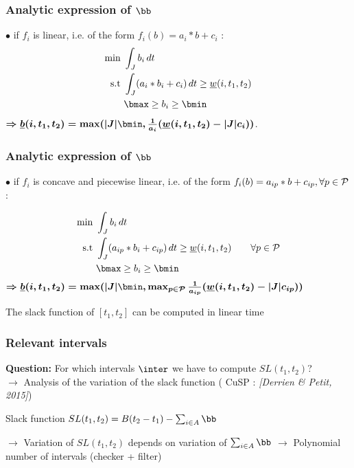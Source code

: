 \begin{frame}
  \frametitle{Analytic expression of $\bb$}
  \vfill
  $\bullet$ if $f_i$ is linear, i.e. of the form $f_i(b)= a_i*b+c_i$ :
  \pause
  \begin{align*}
    \text{min }  & \int_{J} b_i\,dt  \\
    \text{s.t } & \int_{J}(a_i*b_i+c_i)\,dt \ge
                  \underline{w}(i,t_1,t_2)\\
                 & \bmax \ge b_i \ge \bmin
  \end{align*}
  \pause
  { \color{blue!80!black!80}
    $\boldmath{\Rightarrow  \underline{b}(i,t_1,t_2)= \max ( |J|\bmin, \frac{1}{a_i}( \underline{w}(i,t_1,t_2)-|J|c_i))}$}.
  
\end{frame}

\begin{frame}
  \frametitle{Analytic expression of $\bb$}
  \vfill
  $\bullet$  if $f_i$ is concave and piecewise linear, i.e. of the form
  $f_i(b)=a_{ip}*b+c_{ip}, \forall p \in {\cal P}$:
  \pause

  \begin{align*}
    \text{min }  & \int_{J} b_i\,dt  \\
    \text{s.t } & \int_{J}(a_{ip}*b_i+c_{ip})\,dt \ge
                  \underline{w}(i,t_1,t_2) \qquad \forall p \in
                  {\cal P}\\
                 & \bmax \ge b_i \ge \bmin
  \end{align*}
  \pause
  { \color{blue!80!black!80}
    $\boldmath{\Rightarrow  \underline{b}(i,t_1,t_2)= \max ( |J|\bmin, \max_{p
        \in {\cal P}} \frac{1}{a_{ip}}( \underline{w}(i,t_1,t_2)-|J|c_{ip}))}$}
  \vfill
  \begin{prop}
    The slack function of $[t_1,t_2]$ can be computed in linear time
  \end{prop}
\end{frame}


\begin{frame}
  \frametitle{Relevant intervals}
  {\bf Question: } For which intervals $\inter$ we have to compute $SL(t_1,t_2)$?\\
  \vfill
  \pause
  $\rightarrow$ Analysis of the variation of the slack function (
  {\small CuSP : \it \color{gray!50!black!50} [Derrien \& Petit, 2015]})\\
  \vfill
  \pause
  \begin{block}{Slack function}
    \centering $SL(t_1,t_2)=B(t_2-t_1) - \sum_{i \in A} \bb$
  \end{block}
  \pause
  \vspace{0.8cm}
  $\rightarrow$ Variation of $SL(t_1,t_2)$ depends on variation of 
  $\sum_{i \in A} \bb$
  \vfill 
  \pause
  $\rightarrow$ Polynomial number of intervals (checker + filter)  \vfill 
\end{frame}

